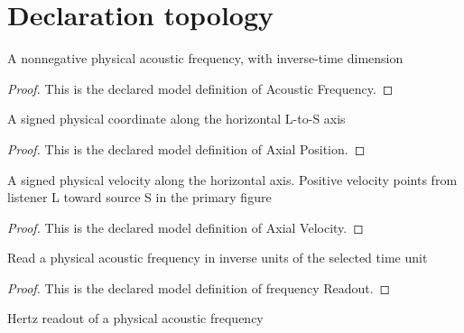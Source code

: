 \section{Declaration topology}
\begin{definition}
  \label{def:physics:phyx-mini-0194:phyxminiproblems-problemphyxmini0194-acousticfrequency}
  A nonnegative physical acoustic frequency, with inverse-time dimension
\end{definition}
\begin{proof}
  This is the declared model definition of Acoustic Frequency.
\end{proof}
\begin{definition}
  \label{def:physics:phyx-mini-0194:phyxminiproblems-problemphyxmini0194-axialposition}
  A signed physical coordinate along the horizontal L-to-S axis
\end{definition}
\begin{proof}
  This is the declared model definition of Axial Position.
\end{proof}
\begin{definition}
  \label{def:physics:phyx-mini-0194:phyxminiproblems-problemphyxmini0194-axialvelocity}
  A signed physical velocity along the horizontal axis. Positive velocity points from listener L toward source S in the primary figure
\end{definition}
\begin{proof}
  This is the declared model definition of Axial Velocity.
\end{proof}
\begin{definition}
  \label{def:physics:phyx-mini-0194:phyxminiproblems-problemphyxmini0194-frequencyreadout}
  Read a physical acoustic frequency in inverse units of the selected time unit
\end{definition}
\begin{proof}
  This is the declared model definition of frequency Readout.
\end{proof}
\begin{definition}
  \label{def:physics:phyx-mini-0194:phyxminiproblems-problemphyxmini0194-frequencyinhertz}
  Hertz readout of a physical acoustic frequency
\end{definition}
